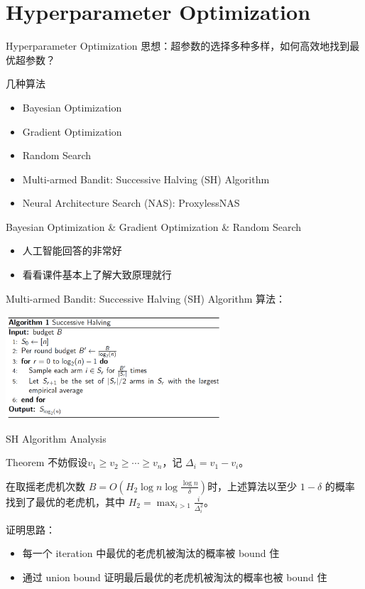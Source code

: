 \section{Hyperparameter Optimization}

\begin{frame}{Hyperparameter Optimization}
    思想：超参数的选择多种多样，如何高效地找到最优超参数？

    几种算法
    \begin{itemize}
        \item Bayesian Optimization
        \item Gradient Optimization
        \item Random Search
        \item Multi-armed Bandit: Successive Halving (SH) Algorithm
        \item Neural Architecture Search (NAS): ProxylessNAS
    \end{itemize}
\end{frame}

\begin{frame}{Bayesian Optimization \& Gradient Optimization \& Random Search}
    \begin{itemize}
        \item 人工智能回答的非常好
        \item 看看课件基本上了解大致原理就行
    \end{itemize}
\end{frame}

\begin{frame}{Multi-armed Bandit: Successive Halving (SH) Algorithm}
    算法：
    \begin{center}
        \includegraphics[width=0.6\textwidth]{assets/sh.png}
    \end{center}
\end{frame}

\begin{frame}{SH Algorithm Analysis}
    \begin{block}{Theorem}
        不妨假设$v_1 \geqslant v_2 \geqslant \cdots \geqslant v_n$，记 $\Delta_i = v_1 - v_i$。

        在取摇老虎机次数 $B = O\left( H_2 \log n \log \frac{\log n}{\delta} \right) $时，上述算法以至少 $1 - \delta$ 的概率找到了最优的老虎机，其中 $H_2 =\max_{i > 1} \frac{i}{\Delta_i^{2}}$。
    \end{block}
    证明思路：
    \begin{itemize}
        \item 每一个 iteration 中最优的老虎机被淘汰的概率被 bound 住
        \item 通过 union bound 证明最后最优的老虎机被淘汰的概率也被 bound 住
    \end{itemize}
\end{frame}

